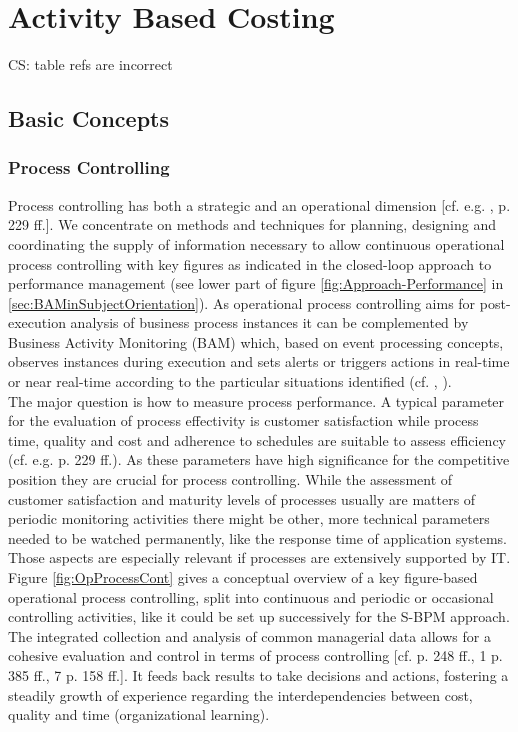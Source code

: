 \section{Activity Based Costing}

CS: table refs are incorrect

\subsection{Basic Concepts}
\subsubsection{Process Controlling}
Process controlling has both a strategic and an operational dimension [cf. e.g. \cite{book:ProzesseSchmelzer}, p. 229 ff.]. We concentrate on methods and techniques for planning, designing and coordinating the supply of information necessary to allow continuous operational process controlling with key figures as indicated in the closed-loop approach to performance management (see lower part of figure \ref{fig:Approach-Performance} in \ref{sec:BAMinSubjectOrientation}). As operational process controlling aims for post-execution analysis of business process instances it can be complemented by Business Activity Monitoring (BAM) which, based on event processing concepts, observes instances during execution and sets alerts or triggers actions in real-time or near real-time according to the particular situations identified (cf. \cite{book:processmonitoring}, \cite{article:BlueprintEventDriven}).
\\
The major question is how to measure process performance. A typical parameter for the evaluation of process effectivity is customer satisfaction while process time, quality and cost and adherence to schedules are suitable to assess efficiency (cf. e.g. \cite{book:ProzesseSchmelzer} p. 229 ff.). As these parameters have high significance for the competitive position they are crucial for process controlling. While the assessment of customer satisfaction and maturity levels of processes usually are matters of periodic monitoring activities there might be other, more technical parameters needed to be watched permanently, like the response time of application systems. Those aspects are especially relevant if processes are extensively supported by IT.
\\
Figure \ref{fig:OpProcessCont} gives a conceptual overview of a key figure-based operational process controlling, split into continuous and periodic or occasional controlling activities, like it could be set up successively for the S-BPM approach.
The integrated collection and analysis of common managerial data allows for a cohesive evaluation and control in terms of process controlling [cf. \cite{book:ProzesseSchmelzer} p. 248 ff., 1 p. 385 ff., 7 p. 158 ff.]. It feeds back results to take decisions and actions, fostering a steadily growth of experience regarding the interdependencies between cost, quality and time (organizational learning).

